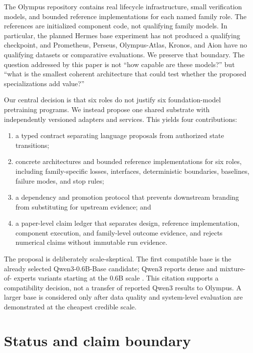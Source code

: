 \documentclass[10pt]{article}
\begin{document}
The Olympus repository contains real lifecycle infrastructure, small
verification models, and bounded reference implementations for each named
family role. The references are initialized component code, not qualifying
family models. In particular, the planned Hermes base experiment has not
produced a qualifying checkpoint, and Prometheus, Perseus, Olympus-Atlas,
Kronos, and Aion have no qualifying datasets or comparative evaluations. We
preserve that boundary. The question addressed by this paper is not ``how
capable are these models?'' but ``what is the smallest coherent architecture
that could test whether the proposed specializations add value?''

Our central decision is that six roles do not justify six foundation-model
pretraining programs. We instead propose one shared substrate with independently
versioned adapters and services. This yields four contributions:

\begin{enumerate}
\item a typed contract separating language proposals from authorized state
transitions;
\item concrete architectures and bounded reference implementations for six
roles, including family-specific losses, interfaces, deterministic boundaries,
baselines, failure modes, and stop rules;
\item a dependency and promotion protocol that prevents downstream branding
from substituting for upstream evidence; and
\item a paper-level claim ledger that separates design, reference
implementation, component execution, and family-level outcome evidence, and
rejects numerical claims without immutable run evidence.
\end{enumerate}

The proposal is deliberately scale-skeptical. The first compatible base is the
already selected Qwen3-0.6B-Base candidate; Qwen3 reports dense and mixture-of-
experts variants starting at the 0.6B scale \citep{yang2025qwen3}. This citation
supports a compatibility decision, not a transfer of reported Qwen3 results to
Olympus. A larger base is considered only after data quality and system-level
evaluation are demonstrated at the cheapest credible scale.

\section{Status and claim boundary}
\end{document}
